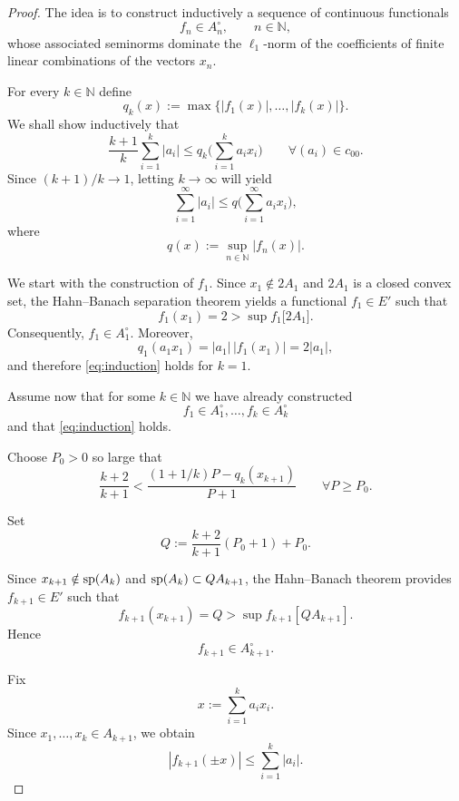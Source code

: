 \documentclass[12pt]{amsart}
\theoremstyle{plain}
\theoremstyle{definition}
\theoremstyle{remark}
\begin{document}
\begin{proof}
The idea is to construct inductively a sequence of continuous functionals
\[
f_n\in A_n^\circ,\qquad n\in\mathbb N,
\]
whose associated seminorms dominate the $\ell_1$-norm of the coefficients of finite linear combinations of the vectors $x_n$.

For every $k\in\mathbb N$ define
\[
q_k(x):=\max\{|f_1(x)|,\ldots,|f_k(x)|\}.
\]
We shall show inductively that
\begin{equation}\label{eq:induction}
\frac{k+1}{k}\sum_{i=1}^{k}|a_i|
   \le
q_k\Big(\sum_{i=1}^{k}a_ix_i\Big)
\qquad
\forall (a_i)\in c_{00}.
\end{equation}
Since $(k+1)/k\to1$, letting $k\to\infty$ will yield
\[
\sum_{i=1}^{\infty}|a_i|
   \le
q\Big(\sum_{i=1}^{\infty}a_ix_i\Big),
\]
where
\[
q(x):=\sup_{n\in\mathbb N}|f_n(x)|.
\]

\medskip

We start with the construction of $f_1$. Since
$x_1\notin 2 A_1$
and $2 A_1$ is a closed convex set, the Hahn--Banach separation theorem yields a functional
$f_1\in E'$ such that
\[
f_1(x_1)=2
   >
\sup f_1\Big[2 A_1\Big].
\]
Consequently,
$f_1\in A_1^\circ$.
Moreover,
\[
q_1(a_1x_1)=|a_1|\,|f_1(x_1)|
=2 |a_1|,
\]
and therefore \eqref{eq:induction} holds for $k=1$.

\medskip

Assume now that for some $k\in\mathbb N$ we have already constructed
\[
f_1\in A_1^\circ,\ldots,f_k\in A_k^\circ
\]
and that \eqref{eq:induction} holds.

Choose $P_0>0$ so large that
\begin{equation}\label{eq:P0}
\frac{k+2}{k+1}
<
\frac{(1+1/k)P-q_k(x_{k+1})}{P+1}
\qquad
\forall P\ge P_0.
\end{equation}

Set
\begin{equation}\label{eq:Q}
Q:=
\frac{k+2}{k+1}(P_0+1)+P_0.
\end{equation}

Since
$x_{k+1}\notin {\rm sp}(A_k)$
and
${\rm sp}(A_k)\subset QA_{k+1}$,
the Hahn--Banach theorem provides
$f_{k+1}\in E'$
such that
\begin{equation}\label{eq:HB}
f_{k+1}(x_{k+1})=Q
>
\sup f_{k+1}[QA_{k+1}].
\end{equation}
Hence
\[
f_{k+1}\in A_{k+1}^\circ.
\]

Fix
\[
x:=\sum_{i=1}^{k}a_ix_i .
\]
Since
$x_1,\ldots,x_k\in A_{k+1}$,
we obtain
\begin{equation}\label{eq:estimate21}
|f_{k+1}(\pm x)|
\le
\sum_{i=1}^{k}|a_i|.
\end{equation}


\end{proof}
\end{document}
